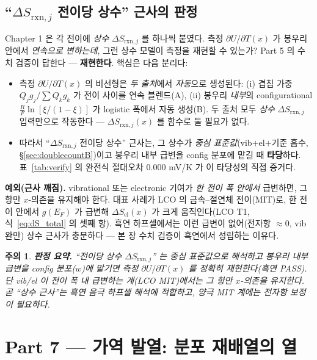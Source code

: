 \documentclass[11pt,a4paper]{article}
\newtheorem*{warnbox}{주의}
\newcommand{\rxn}{\mathrm{rxn}}
\newcommand{\elc}{\mathrm{el}}
\begin{document}
\subsection{``$\Delta S_{\rxn,j}$ 전이당 상수'' 근사의 판정}\label{sec:verdict}
Chapter 1 은 각 전이에 \emph{상수} $\Delta S_{\rxn,j}$ 를 하나씩 붙였다. 측정 $\partial U/\partial T(x)$ 가
봉우리 안에서 \emph{연속으로 변하는데}, 그런 상수 모델이 측정을 재현할 수 있는가? Part 5 의 수치 검증이
답한다 — \textbf{재현한다}. 핵심은 다음 분리다:
\begin{itemize}[leftmargin=1.6em,itemsep=3pt]
\item 측정 $\partial U/\partial T(x)$ 의 비선형은 \emph{두 출처}에서 \emph{자동}으로 생성된다:
(i) 겹침 가중 $Q_jg_j/\sum Q_kg_k$ 가 전이 사이를 연속 블렌드(A), (ii) 봉우리 \emph{내부}의 configurational
$\tfrac{R}{F}\ln[\xi/(1-\xi)]$ 가 logistic 폭에서 자동 생성(B). 두 출처 모두 \emph{상수} $\Delta S_{\rxn,j}$
입력만으로 작동한다 — $\Delta S_{\rxn,j}(x)$ 를 함수로 둘 필요가 없다.
\item 따라서 ``$\Delta S_{\rxn,j}$ 전이당 상수'' 근사는, 그 상수가 \emph{중심 표준값}(vib$+$el$+$기준
흡수, \S\ref{sec:doublecountB})이고 봉우리 내부 급변을 config 분포에 맡길 때 \textbf{타당}하다. 표~\ref{tab:verify}
의 완전식 절대오차 $0.000$ mV/K 가 이 타당성의 직접 증거다.
\end{itemize}
\textbf{예외(근사 깨짐).} vibrational 또는 electronic 기여가 \emph{한 전이 폭 안에서} 급변하면, 그 항만
$x$-의존을 유지해야 한다. 대표 사례가 LCO 의 금속--절연체 전이(MIT)로, 한 전이 안에서 $g(E_F)$ 가 급변해
$\Delta S_\elc(x)$ 가 크게 움직인다(LCO T1, 식~\eqref{eq:dS_total} 의 셋째 항). 흑연 하프셀에서는 이런
급변이 없어(전자항 $\approx0$, vib 완만) 상수 근사가 충분하다 — 본 장 수치 검증이 흑연에서 성립하는 이유다.

\begin{warnbox}
\textbf{판정 요약.} ``전이당 상수 $\Delta S_{\rxn,j}$'' 는 \emph{중심 표준값}으로 해석하고 봉우리 내부
급변을 config 분포($w$)에 맡기면 측정 $\partial U/\partial T(x)$ 를 정확히 재현한다(흑연 PASS). 단 vib/el 이
전이 폭 내 급변하는 계(LCO MIT)에서는 그 항만 $x$-의존을 유지한다. 곧 ``상수 근사''는 흑연 음극 하프셀
해석에 적합하고, 양극 MIT 계에는 전자항 보정이 필요하다.
\end{warnbox}

\section*{Part 7 — 가역 발열: 분포 재배열의 열}
\end{document}
